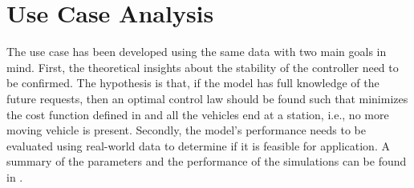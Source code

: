 


\section{Use Case Analysis}\label{sec:use_case_mpc}
The use case has been developed using the same data  with two main goals in mind. First, the theoretical insights about the stability of the controller need to be confirmed. The hypothesis is that, if the model has full knowledge of the future requests, then an optimal control law should be found such that minimizes the cost function defined in  and all the vehicles end at a station, i.e., no more moving vehicle is present. Secondly, the model's performance needs to be evaluated using real-world data to determine if it is feasible for application. A summary of the parameters and the performance of the simulations can be found in . 




